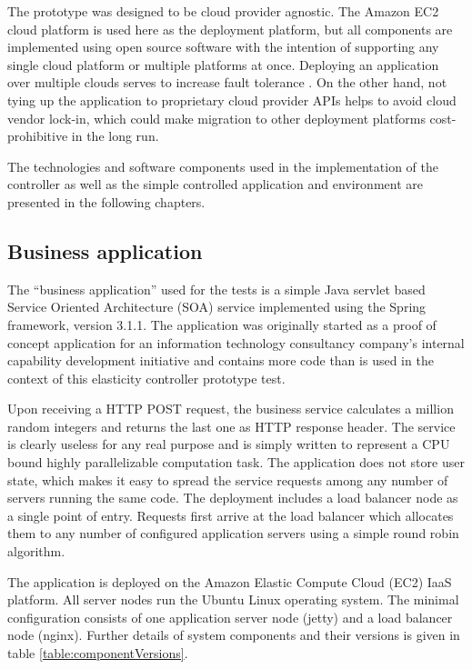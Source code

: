 \documentclass[english]{tktltiki2}
\theoremstyle{definition}
\theoremstyle{remark}
\begin{document}
The prototype was designed to be cloud provider agnostic. The Amazon EC2 cloud
platform is used here as the deployment platform, but all components are
implemented using open source software with the intention of supporting any
single cloud platform or multiple platforms at once. Deploying an application
over multiple clouds serves to increase fault tolerance . On the other hand, not tying up the application to proprietary
cloud provider APIs helps to avoid cloud vendor lock-in, which could make
migration to other deployment platforms cost-prohibitive in the long run.

The technologies and software components used in the implementation of the
controller as well as the simple controlled application and environment are
presented in the following chapters.

\subsection{Business application}

The ``business application'' used for the tests is a simple Java servlet based
Service Oriented Architecture (SOA) service implemented using the Spring
framework, version 3.1.1. The application was originally started as a proof of
concept application for an information technology consultancy company's internal
capability development initiative and contains more code than is used in the
context of this elasticity controller prototype test.

Upon receiving a HTTP POST request, the business service calculates a million
random integers and returns the last one as HTTP response header. The service is
clearly useless for any real purpose and is simply written to represent a CPU
bound highly parallelizable computation task. The application does not store
user state, which makes it easy to spread the service requests among any number
of servers running the same code. The deployment includes a load balancer node
as a single point of entry. Requests first arrive at the load balancer which
allocates them to any number of configured application servers using a simple
round robin algorithm.

The application is deployed on the Amazon Elastic Compute Cloud (EC2) IaaS
platform. All server nodes run the Ubuntu Linux operating system. The minimal
configuration consists of one application server node (jetty) and a load
balancer node (nginx). Further details of system components and their versions
is given in table \ref{table:componentVersions}.
\end{document}
